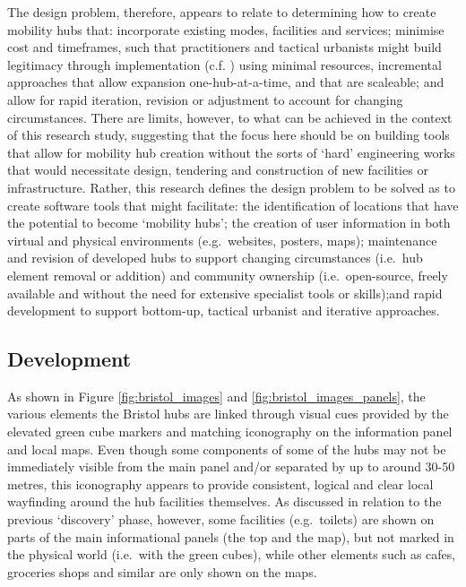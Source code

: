 \documentclass[preprint, 3p,
authoryear]{elsarticle} %
\begin{document}
The design problem, therefore, appears to relate to determining how to
create mobility hubs that: incorporate existing modes, facilities and
services; minimise cost and timeframes, such that practitioners and
tactical urbanists might build legitimacy through implementation (c.f.
\cite{Reynolds:2020aa,Reynolds:2021ab}) using minimal resources,
incremental approaches that allow expansion one-hub-at-a-time, and that
are scaleable; and allow for rapid iteration, revision or adjustment to
account for changing circumstances. There are limits, however, to what
can be achieved in the context of this research study, suggesting that
the focus here should be on building tools that allow for mobility hub
creation without the sorts of `hard' engineering works that would
necessitate design, tendering and construction of new facilities or
infrastructure. Rather, this research defines the design problem to be
solved as to create software tools that might facilitate: the
identification of locations that have the potential to become `mobility
hubs'; the creation of user information in both virtual and physical
environments (e.g.~websites, posters, maps); maintenance and revision of
developed hubs to support changing circumstances (i.e.~hub element
removal or addition) and community ownership (i.e.~open-source, freely
available and without the need for extensive specialist tools or
skills);and rapid development to support bottom-up, tactical urbanist
and iterative approaches.

\subsection{Development}\label{development}

As shown in Figure \ref{fig:bristol_images} and
\ref{fig:bristol_images_panels}, the various elements the Bristol hubs
are linked through visual cues provided by the elevated green cube
markers and matching iconography on the information panel and local
maps. Even though some components of some of the hubs may not be
immediately visible from the main panel and/or separated by up to around
30-50 metres, this iconography appears to provide consistent, logical
and clear local wayfinding around the hub facilities themselves. As
discussed in relation to the previous `discovery' phase, however, some
facilities (e.g.~toilets) are shown on parts of the main informational
panels (the top and the map), but not marked in the physical world
(i.e.~with the green cubes), while other elements such as cafes,
groceries shops and similar are only shown on the maps.
\end{document}
